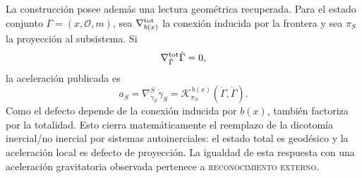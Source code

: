 \enlargethispage{5\baselineskip}
La construcción posee además una lectura geométrica recuperada. Para el
estado conjunto \(\Gamma=(x,\mathcal O,m)\), sea
\(\nabla^{\rm tot}_{b(x)}\) la conexión inducida por la frontera y sea
\(\pi_S\) la proyección al subsistema. Si
\[
 \nabla^{\rm tot}_{\dot\Gamma}\dot\Gamma=0,
\]
la aceleración publicada es
\[
 a_S
 =\nabla^S_{\dot\gamma_S}\dot\gamma_S
 =\mathcal K_{\pi_S}^{\,b(x)}(\dot\Gamma,\dot\Gamma).
\]
Como el defecto depende de la conexión inducida por \(b(x)\), también
factoriza por la totalidad. Esto cierra matemáticamente el reemplazo de la
dicotomía inercial/no inercial por sistemas autoinerciales: el estado total
es geodésico y la aceleración local es defecto de proyección. La igualdad de
esta respuesta con una aceleración gravitatoria observada pertenece a
\textsc{reconocimiento externo}.


